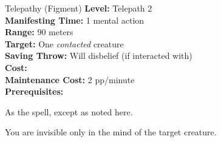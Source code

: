 {Telepathy (Figment)}
{
    \textbf{Level:}
    Telepath 2\\
    \textbf{Manifesting Time:}
    1 mental action\\
    \textbf{Range:}
    90 meters\\
    \textbf{Target:}
    One \emph{contacted} creature\\
    \textbf{Saving Throw:}
    Will disbelief (if interacted with)\\
    \textbf{Cost:}
    \\
    \textbf{Maintenance Cost:}
    2 pp/minute\\
    \textbf{Prerequisites:}
    \\
}
{
    As the  spell, except as noted here.

    You are invisible only in the mind of the target creature.
}
